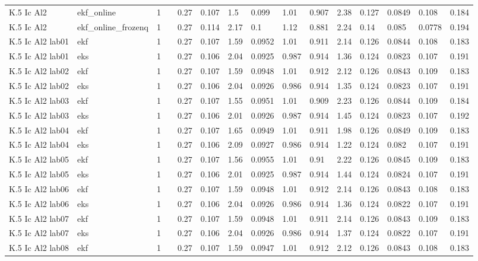 \begin{table}[t]
\begin{tabular}{lllllllllllllll}
K.5 Ic Al2 & ekf\_online & 1 &  & 0.27 & 0.107 & 1.5 & 0.099 & 1.01 & 0.907 & 2.38 & 0.127 & 0.0849 & 0.108 & 0.184 \\
K.5 Ic Al2 & ekf\_online\_frozenq & 1 &  & 0.27 & 0.114 & 2.17 & 0.1 & 1.12 & 0.881 & 2.24 & 0.14 & 0.085 & 0.0778 & 0.194 \\
K.5 Ic Al2 lab01 & ekf & 1 &  & 0.27 & 0.107 & 1.59 & 0.0952 & 1.01 & 0.911 & 2.14 & 0.126 & 0.0844 & 0.108 & 0.183 \\
K.5 Ic Al2 lab01 & eks & 1 &  & 0.27 & 0.106 & 2.04 & 0.0925 & 0.987 & 0.914 & 1.36 & 0.124 & 0.0823 & 0.107 & 0.191 \\
K.5 Ic Al2 lab02 & ekf & 1 &  & 0.27 & 0.107 & 1.59 & 0.0948 & 1.01 & 0.912 & 2.12 & 0.126 & 0.0843 & 0.109 & 0.183 \\
K.5 Ic Al2 lab02 & eks & 1 &  & 0.27 & 0.106 & 2.04 & 0.0926 & 0.986 & 0.914 & 1.35 & 0.124 & 0.0823 & 0.107 & 0.191 \\
K.5 Ic Al2 lab03 & ekf & 1 &  & 0.27 & 0.107 & 1.55 & 0.0951 & 1.01 & 0.909 & 2.23 & 0.126 & 0.0844 & 0.109 & 0.184 \\
K.5 Ic Al2 lab03 & eks & 1 &  & 0.27 & 0.106 & 2.01 & 0.0926 & 0.987 & 0.914 & 1.45 & 0.124 & 0.0823 & 0.107 & 0.192 \\
K.5 Ic Al2 lab04 & ekf & 1 &  & 0.27 & 0.107 & 1.65 & 0.0949 & 1.01 & 0.911 & 1.98 & 0.126 & 0.0849 & 0.109 & 0.183 \\
K.5 Ic Al2 lab04 & eks & 1 &  & 0.27 & 0.106 & 2.09 & 0.0927 & 0.986 & 0.914 & 1.22 & 0.124 & 0.082 & 0.107 & 0.191 \\
K.5 Ic Al2 lab05 & ekf & 1 &  & 0.27 & 0.107 & 1.56 & 0.0955 & 1.01 & 0.91 & 2.22 & 0.126 & 0.0845 & 0.109 & 0.183 \\
K.5 Ic Al2 lab05 & eks & 1 &  & 0.27 & 0.106 & 2.01 & 0.0925 & 0.987 & 0.914 & 1.44 & 0.124 & 0.0824 & 0.107 & 0.191 \\
K.5 Ic Al2 lab06 & ekf & 1 &  & 0.27 & 0.107 & 1.59 & 0.0948 & 1.01 & 0.912 & 2.14 & 0.126 & 0.0843 & 0.108 & 0.183 \\
K.5 Ic Al2 lab06 & eks & 1 &  & 0.27 & 0.106 & 2.04 & 0.0926 & 0.986 & 0.914 & 1.36 & 0.124 & 0.0822 & 0.107 & 0.191 \\
K.5 Ic Al2 lab07 & ekf & 1 &  & 0.27 & 0.107 & 1.59 & 0.0948 & 1.01 & 0.911 & 2.14 & 0.126 & 0.0843 & 0.109 & 0.183 \\
K.5 Ic Al2 lab07 & eks & 1 &  & 0.27 & 0.106 & 2.04 & 0.0926 & 0.986 & 0.914 & 1.37 & 0.124 & 0.0822 & 0.107 & 0.191 \\
K.5 Ic Al2 lab08 & ekf & 1 &  & 0.27 & 0.107 & 1.59 & 0.0947 & 1.01 & 0.912 & 2.12 & 0.126 & 0.0843 & 0.108 & 0.183 \\

\end{tabular}
\end{table}
